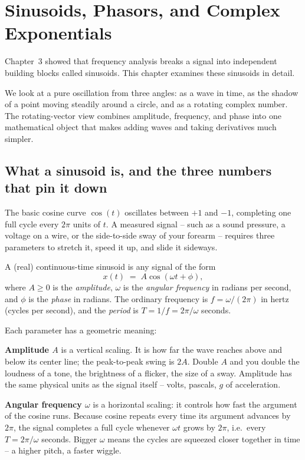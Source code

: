 \chapter{Sinusoids, Phasors, and Complex Exponentials}

Chapter~3 showed that frequency analysis breaks a signal into independent building blocks called sinusoids. This chapter examines these sinusoids in detail.

We look at a pure oscillation from three angles: as a wave in time, as the shadow of a point moving steadily around a circle, and as a rotating complex number. The rotating-vector view combines amplitude, frequency, and phase into one mathematical object that makes adding waves and taking derivatives much simpler.

\section{What a sinusoid is, and the three numbers that pin it down}
\label{ch04:three-numbers}

The basic cosine curve $\cos(t)$ oscillates between $+1$ and $-1$, completing one full cycle every $2\pi$ units of $t$. A measured signal -- such as a sound pressure, a voltage on a wire, or the side-to-side sway of your forearm -- requires three parameters to stretch it, speed it up, and slide it sideways.

\begin{definition}
\label{ch04:def-sinusoid}
A (real) continuous-time sinusoid is any signal of the form
\[
  x(t) \;=\; A\cos(\omega t + \phi),
\]
where $A \ge 0$ is the \emph{amplitude}, $\omega$ is the \emph{angular frequency} in radians per
second, and $\phi$ is the \emph{phase} in radians. The ordinary frequency is $f = \omega/(2\pi)$
in hertz (cycles per second), and the \emph{period} is $T = 1/f = 2\pi/\omega$ seconds.
\end{definition}

Each parameter has a geometric meaning:

\textbf{Amplitude $A$} is a vertical scaling. It is how far the wave reaches above and below its
center line; the peak-to-peak swing is $2A$. Double $A$ and you double the loudness of a tone,
the brightness of a flicker, the size of a sway. Amplitude has the same physical units as the
signal itself -- volts, pascals, $g$ of acceleration.

\textbf{Angular frequency $\omega$} is a horizontal scaling: it controls how fast the argument of
the cosine runs. Because cosine repeats every time its argument advances by $2\pi$, the signal
completes a full cycle whenever $\omega t$ grows by $2\pi$, i.e.\ every $T = 2\pi/\omega$ seconds.
Bigger $\omega$ means the cycles are squeezed closer together in time -- a higher pitch, a faster
wiggle.

